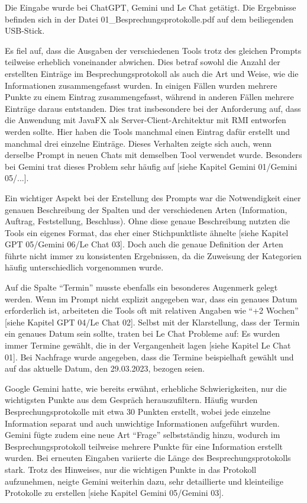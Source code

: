 Die Eingabe wurde bei ChatGPT, Gemini und Le Chat getätigt. Die Ergebnisse befinden sich in der Datei 
01\_Besprechungsprotokolle.pdf auf dem beiliegenden USB-Stick.

Es fiel auf, dass die Ausgaben der verschiedenen Tools trotz des gleichen Prompts teilweise erheblich voneinander 
abwichen. Dies betraf sowohl die Anzahl der erstellten Einträge im Besprechungsprotokoll als auch die Art und 
Weise, wie die Informationen zusammengefasst wurden. In einigen Fällen wurden mehrere Punkte zu einem Eintrag 
zusammengefasst, während in anderen Fällen mehrere Einträge daraus entstanden. Dies trat insbesondere bei der 
Anforderung auf, dass die Anwendung mit JavaFX als Server-Client-Architektur mit RMI entworfen werden sollte. 
Hier haben die Tools manchmal einen Eintrag dafür erstellt und manchmal drei einzelne Einträge. Dieses Verhalten 
zeigte sich auch, wenn derselbe Prompt in neuen Chats mit demselben Tool verwendet wurde. Besonders bei Gemini trat 
dieses Problem sehr häufig auf [siehe Kapitel Gemini 01/Gemini 05/...].

Ein wichtiger Aspekt bei der Erstellung des Prompts war die Notwendigkeit einer genauen Beschreibung der Spalten 
und der verschiedenen Arten (Information, Auftrag, Feststellung, Beschluss). Ohne diese genaue Beschreibung nutzten 
die Tools ein eigenes Format, das eher einer Stichpunktliste ähnelte [siehe Kapitel GPT 05/Gemini 06/Le Chat 03]. 
Doch auch die genaue Definition der Arten führte nicht immer zu konsistenten Ergebnissen, da die Zuweisung der Kategorien 
häufig unterschiedlich vorgenommen wurde.

Auf die Spalte ``Termin'' musste ebenfalls ein besonderes Augenmerk gelegt werden. Wenn im Prompt nicht explizit 
angegeben war, dass ein genaues Datum erforderlich ist, arbeiteten die Tools oft mit relativen Angaben wie ``+2 Wochen'' 
[siehe Kapitel GPT 04/Le Chat 02]. Selbst mit der Klarstellung, dass der Termin ein genaues Datum sein sollte, traten 
bei Le Chat Probleme auf: Es wurden immer Termine gewählt, die in der Vergangenheit lagen [siehe Kapitel Le Chat 01]. 
Bei Nachfrage wurde angegeben, dass die Termine beispielhaft gewählt und auf das aktuelle Datum, den 29.03.2023, 
bezogen seien.

Google Gemini hatte, wie bereits erwähnt, erhebliche Schwierigkeiten, nur die wichtigsten Punkte aus dem Gespräch 
herauszufiltern. Häufig wurden Besprechungsprotokolle mit etwa 30 Punkten erstellt, wobei jede einzelne Information 
separat und auch unwichtige Informationen aufgeführt wurden. Gemini fügte zudem eine neue Art ``Frage'' selbstständig 
hinzu, wodurch im Besprechungsprotokoll teilweise mehrere Punkte für eine Information erstellt wurden. Bei erneuten 
Eingaben variierte die Länge des Besprechungsprotokolls stark. Trotz des Hinweises, nur die wichtigen Punkte in das 
Protokoll aufzunehmen, neigte Gemini weiterhin dazu, sehr detaillierte und kleinteilige Protokolle zu erstellen 
[siehe Kapitel Gemini 05/Gemini 03].

